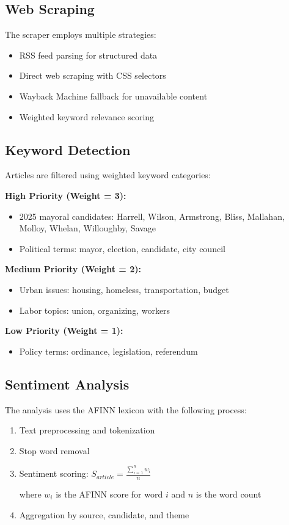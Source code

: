 \documentclass[11pt]{article}
\begin{document}
\subsection{Web Scraping}

The scraper employs multiple strategies:
\begin{itemize}
    \item RSS feed parsing for structured data
    \item Direct web scraping with CSS selectors
    \item Wayback Machine fallback for unavailable content
    \item Weighted keyword relevance scoring
\end{itemize}

\subsection{Keyword Detection}

Articles are filtered using weighted keyword categories:

\textbf{High Priority (Weight = 3):}
\begin{itemize}
    \item 2025 mayoral candidates: Harrell, Wilson, Armstrong, Bliss, Mallahan, Molloy, Whelan, Willoughby, Savage
    \item Political terms: mayor, election, candidate, city council
\end{itemize}

\textbf{Medium Priority (Weight = 2):}
\begin{itemize}
    \item Urban issues: housing, homeless, transportation, budget
    \item Labor topics: union, organizing, workers
\end{itemize}

\textbf{Low Priority (Weight = 1):}
\begin{itemize}
    \item Policy terms: ordinance, legislation, referendum
\end{itemize}

\subsection{Sentiment Analysis}

The analysis uses the AFINN lexicon with the following process:

\begin{enumerate}
    \item Text preprocessing and tokenization
    \item Stop word removal
    \item Sentiment scoring: $S_{article} = \frac{\sum_{i=1}^{n} w_i}{n}$
    
    where $w_i$ is the AFINN score for word $i$ and $n$ is the word count
    \item Aggregation by source, candidate, and theme
\end{enumerate}
\end{document}
